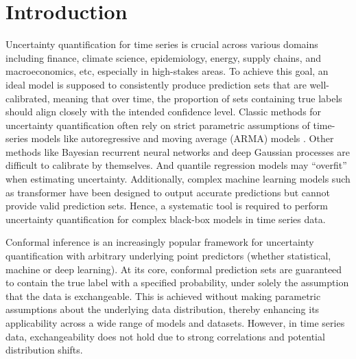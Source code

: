 \section{Introduction}
Uncertainty quantification for time series is crucial across various domains including finance, climate science, epidemiology, energy, supply chains, and macroeconomics, etc, especially in high-stakes areas. To achieve this goal, an ideal model is supposed to consistently produce prediction sets that are well-calibrated, meaning that over time, the proportion of sets containing true labels should align closely with the intended confidence level. Classic methods for uncertainty quantification often rely on strict parametric assumptions of time-series models like autoregressive and moving average (ARMA) models \citep{brockwell1991time}. Other methods like Bayesian recurrent neural networks \citep{fortunato2017bayesian} and deep Gaussian processes \citep{li2020stochastic} are difficult to calibrate by themselves. And quantile regression models \citep{gasthaus2019probabilistic}  may ``overfit'' when estimating uncertainty. Additionally, complex machine learning models such as transformer \citep{NIPS2017_3f5ee243,li2019enhancing,gao2024inducing} have been designed to output accurate predictions but cannot provide valid prediction sets.
Hence, a systematic tool is required to perform uncertainty quantification for complex black-box models in time series data.

Conformal inference \citep{vovk2005algorithmic} is an increasingly popular framework for uncertainty quantification with arbitrary underlying point predictors (whether statistical, machine or deep learning). At its core, conformal prediction sets are guaranteed to contain the true label with a specified probability, under solely the assumption that the data is exchangeable. This is achieved without making parametric assumptions about the underlying data distribution, thereby enhancing its applicability across a wide range of models and datasets. However, in time series data, exchangeability does not hold due to strong correlations and potential distribution shifts. 

